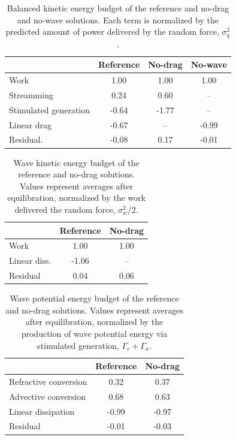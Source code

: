 \documentclass[12pt]{article}
\newcommand{\?}{\stackrel{?}{=}}
\begin{document}
\begin{table}
 \begin{center}
   \caption{Balanced kinetic energy budget of the reference and no-drag and no-wave solutions.
              Each term is normalized by the predicted amount of power delivered by
              the random force, $\sigma_q^2$.}
   \label{K-budgets}
   \begin{tabular}{ l | c | c | c }
     \hline
       &  Reference & No-drag & No-wave \\
      \hline
      Work & 1.00 &   1.00   &  1.00\\
      Streamming & 0.24 & 0.60 & --\\
      Stimulated generation & -0.64 & -1.77 & --\\
      Linear drag & -0.67 & -- & -0.99\\
      Residual. & -0.08 & 0.17 & -0.01\\
   \end{tabular}
\end{center}
\end{table}


\begin{table}
 \begin{center}
   \caption{Wave kinetic energy budget of the reference and no-drag solutions.
              Values represent averages after equilibration, normalized by the work
              delivered the random force, $\sigma_w^2/2$.}
   \label{A-budgets}
   \begin{tabular}{ l | c | c }
     \hline
       &  Reference & No-drag  \\
      \hline
      Work & 1.00 &   1.00   \\
      Linear diss. & -1.06 & --\\
      Residual & 0.04 & 0.06 \\
   \end{tabular}
 \end{center}
\end{table}

\begin{table}
 \begin{center}
   \caption{Wave potential energy budget of the reference and no-drag solutions.
              Values represent averages after equilibration, normalized by the production
              of wave potential energy via stimulated generation, $\Gamma_r + \Gamma_a$.}
   \label{P-budgets}
   \begin{tabular}{ l | c | c }
     \hline
       &  Reference & No-drag  \\
      \hline
      Refractive conversion & 0.32  & 0.37 \\
      Advective conversion  & 0.68  & 0.63 \\
      Linear dissipation & -0.99 & -0.97\\
      Residual & -0.01 & -0.03\\
   \end{tabular}
 \end{center}
\end{table}

%
%

\clearpage

\end{document}
